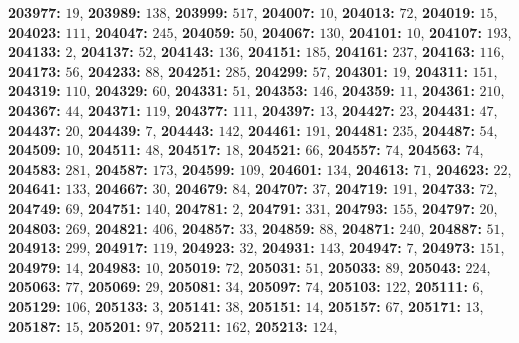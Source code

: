 \textsf{\bfseries 203977:} $19$, \textsf{\bfseries 203989:} $138$, \textsf{\bfseries 203999:} $517$, \textsf{\bfseries 204007:} $10$, \textsf{\bfseries 204013:} $72$, \textsf{\bfseries 204019:} $15$, \textsf{\bfseries 204023:} $111$, \textsf{\bfseries 204047:} $245$, \textsf{\bfseries 204059:} $50$, \textsf{\bfseries 204067:} $130$, \textsf{\bfseries 204101:} $10$, \textsf{\bfseries 204107:} $193$, \textsf{\bfseries 204133:} $2$, \textsf{\bfseries 204137:} $52$, \textsf{\bfseries 204143:} $136$, \textsf{\bfseries 204151:} $185$, \textsf{\bfseries 204161:} $237$, \textsf{\bfseries 204163:} $116$, \textsf{\bfseries 204173:} $56$, \textsf{\bfseries 204233:} $88$, \textsf{\bfseries 204251:} $285$, \textsf{\bfseries 204299:} $57$, \textsf{\bfseries 204301:} $19$, \textsf{\bfseries 204311:} $151$, \textsf{\bfseries 204319:} $110$, \textsf{\bfseries 204329:} $60$, \textsf{\bfseries 204331:} $51$, \textsf{\bfseries 204353:} $146$, \textsf{\bfseries 204359:} $11$, \textsf{\bfseries 204361:} $210$, \textsf{\bfseries 204367:} $44$, \textsf{\bfseries 204371:} $119$, \textsf{\bfseries 204377:} $111$, \textsf{\bfseries 204397:} $13$, \textsf{\bfseries 204427:} $23$, \textsf{\bfseries 204431:} $47$, \textsf{\bfseries 204437:} $20$, \textsf{\bfseries 204439:} $7$, \textsf{\bfseries 204443:} $142$, \textsf{\bfseries 204461:} $191$, \textsf{\bfseries 204481:} $235$, \textsf{\bfseries 204487:} $54$, \textsf{\bfseries 204509:} $10$, \textsf{\bfseries 204511:} $48$, \textsf{\bfseries 204517:} $18$, \textsf{\bfseries 204521:} $66$, \textsf{\bfseries 204557:} $74$, \textsf{\bfseries 204563:} $74$, \textsf{\bfseries 204583:} $281$, \textsf{\bfseries 204587:} $173$, \textsf{\bfseries 204599:} $109$, \textsf{\bfseries 204601:} $134$, \textsf{\bfseries 204613:} $71$, \textsf{\bfseries 204623:} $22$, \textsf{\bfseries 204641:} $133$, \textsf{\bfseries 204667:} $30$, \textsf{\bfseries 204679:} $84$, \textsf{\bfseries 204707:} $37$, \textsf{\bfseries 204719:} $191$, \textsf{\bfseries 204733:} $72$, \textsf{\bfseries 204749:} $69$, \textsf{\bfseries 204751:} $140$, \textsf{\bfseries 204781:} $2$, \textsf{\bfseries 204791:} $331$, \textsf{\bfseries 204793:} $155$, \textsf{\bfseries 204797:} $20$, \textsf{\bfseries 204803:} $269$, \textsf{\bfseries 204821:} $406$, \textsf{\bfseries 204857:} $33$, \textsf{\bfseries 204859:} $88$, \textsf{\bfseries 204871:} $240$, \textsf{\bfseries 204887:} $51$, \textsf{\bfseries 204913:} $299$, \textsf{\bfseries 204917:} $119$, \textsf{\bfseries 204923:} $32$, \textsf{\bfseries 204931:} $143$, \textsf{\bfseries 204947:} $7$, \textsf{\bfseries 204973:} $151$, \textsf{\bfseries 204979:} $14$, \textsf{\bfseries 204983:} $10$, \textsf{\bfseries 205019:} $72$, \textsf{\bfseries 205031:} $51$, \textsf{\bfseries 205033:} $89$, \textsf{\bfseries 205043:} $224$, \textsf{\bfseries 205063:} $77$, \textsf{\bfseries 205069:} $29$, \textsf{\bfseries 205081:} $34$, \textsf{\bfseries 205097:} $74$, \textsf{\bfseries 205103:} $122$, \textsf{\bfseries 205111:} $6$, \textsf{\bfseries 205129:} $106$, \textsf{\bfseries 205133:} $3$, \textsf{\bfseries 205141:} $38$, \textsf{\bfseries 205151:} $14$, \textsf{\bfseries 205157:} $67$, \textsf{\bfseries 205171:} $13$, \textsf{\bfseries 205187:} $15$, \textsf{\bfseries 205201:} $97$, \textsf{\bfseries 205211:} $162$, \textsf{\bfseries 205213:} $124$, 
